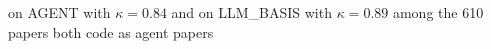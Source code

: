 on AGENT with $\kappa = 0.84$ and on LLM\_BASIS with $\kappa = 0.89$ among the 610 papers both code as agent papers